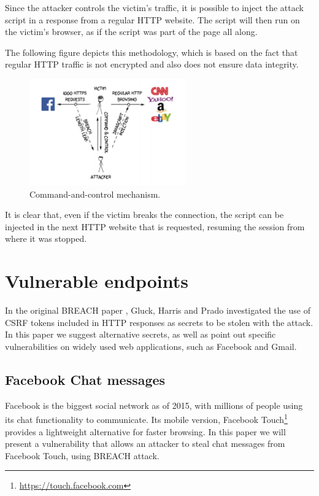 Since the attacker controls the victim's traffic, it is possible to inject the
attack script in a response from a regular HTTP website. The script will then
run on the victim's browser, as if the script was part of the page all along.

The following figure depicts this methodology, which is based on the fact that
regular HTTP traffic is not encrypted and also does not ensure data integrity.

\begin{figure}[H] \caption{Command-and-control mechanism.} \centering
\includegraphics[width=0.6\textwidth]{diagrams/breach_mitm.png}\end{figure}

It is clear that, even if the victim breaks the connection, the script can be
injected in the next HTTP website that is requested, resuming the session from
where it was stopped.

\section{Vulnerable endpoints}\label{sec:vulnerabilities}

In the original BREACH paper \cite{breach}, Gluck, Harris and Prado investigated
the use of CSRF tokens included in HTTP responses as secrets to be stolen with
the attack. In this paper we suggest alternative secrets, as well as point out
specific vulnerabilities on widely used web applications, such as Facebook and
Gmail.

\subsection{Facebook Chat messages}\label{subsec:fb}

Facebook is the biggest social network as of 2015, with millions of people using
its chat functionality to communicate. Its mobile version, Facebook
Touch\footnote{\url{https://touch.facebook.com}} provides a lightweight
alternative for faster browsing. In this paper we will present a vulnerability
that allows an attacker to steal chat messages from Facebook Touch, using BREACH
attack.

